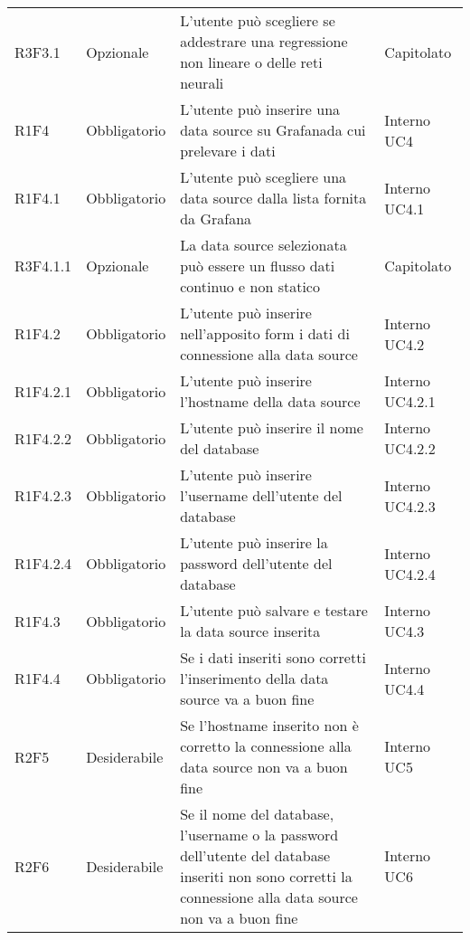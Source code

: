 \begin{longtable} {
		>{}p{24mm} 
		>{}p{32mm}
		>{}p{40mm} 
		>{}p{24.5mm}
		}
		R3F3.1 & Opzionale & L'utente può scegliere se addestrare una regressione non lineare o delle reti neurali\glo & Capitolato \TBstrut \\ [2mm]
		R1F4 & Obbligatorio & L'utente può inserire una data source su Grafana\glosp da cui prelevare i dati & Interno UC4 \TBstrut \\ [2mm]
		R1F4.1 & Obbligatorio & L'utente può scegliere una data source dalla lista fornita da Grafana\glo & Interno UC4.1 \TBstrut \\ [2mm]
		R3F4.1.1 & Opzionale & La data source selezionata può essere un flusso dati continuo e non statico & Capitolato \TBstrut \\ [2mm]
        R1F4.2 & Obbligatorio & L'utente può inserire nell'apposito form i dati di connessione alla data source & Interno UC4.2 \TBstrut \\ [2mm]
		R1F4.2.1 & Obbligatorio & L'utente può inserire l'hostname della data source & Interno UC4.2.1 \TBstrut \\ [2mm]
		R1F4.2.2 & Obbligatorio & L'utente può inserire il nome del database & Interno UC4.2.2 \TBstrut \\ [2mm]
        R1F4.2.3 & Obbligatorio & L'utente può inserire l'username dell'utente del database & Interno UC4.2.3 \TBstrut \\ [2mm]
        R1F4.2.4 & Obbligatorio & L'utente può inserire la password dell'utente del database & Interno UC4.2.4 \TBstrut \\ [2mm]
		R1F4.3 & Obbligatorio & L'utente può salvare e testare la data source inserita & Interno UC4.3 \TBstrut \\ [2mm]
		R1F4.4 & Obbligatorio & Se i dati inseriti sono corretti l'inserimento della data source va a buon fine & Interno UC4.4 \TBstrut \\ [2mm]
        R2F5 & Desiderabile & Se l'hostname inserito non è corretto la connessione alla data source non va a buon fine & Interno UC5 \TBstrut \\ [2mm]
		R2F6 & Desiderabile & Se il nome del database, l'username o la password dell'utente del database inseriti non sono corretti la connessione alla data source non va a buon fine & Interno UC6 \TBstrut \\ [2mm]
	\end{longtable}